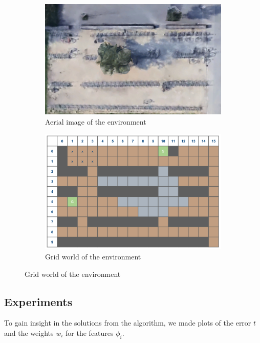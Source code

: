 \documentclass[10pt,a4paper,twocolumn]{article}
\begin{document}
\begin{figure}[h]
\begin{subfigure}[b]{0.5\textwidth}
	\includegraphics[width=\textwidth]{google}
	\caption{Aerial image of the environment}
	\label{fig:google}
\end{subfigure}
\begin{subfigure}[b]{0.5\textwidth}
	\includegraphics[width=\textwidth]{gridworld}
	\caption{Grid world of the environment}
	\label{fig:gridworld}
\end{subfigure}
\end{figure}

\subsection{Experiments}
To gain insight in the solutions from the algorithm, we made plots of the error $t$ and the weights $w_i$ for the features $\phi_i$.
\end{document}
